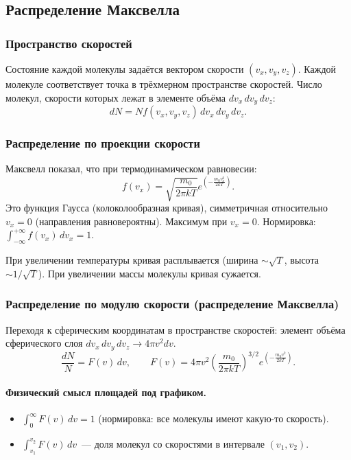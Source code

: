 \documentclass[12pt]{article}
\begin{document}
\subsection{Распределение Максвелла}

\subsubsection{Пространство скоростей}

Состояние каждой молекулы задаётся вектором скорости $(v_x, v_y, v_z)$. Каждой молекуле соответствует точка в трёхмерном пространстве скоростей. Число молекул, скорости которых лежат в элементе объёма $dv_x\,dv_y\,dv_z$:
\[
	dN = N f(v_x, v_y, v_z) \, dv_x \, dv_y \, dv_z.
\]

\subsubsection{Распределение по проекции скорости}

Максвелл показал, что при термодинамическом равновесии:
\[
	f(v_x) = \sqrt{\frac{m_0}{2\pi kT}} e^{\left(-\frac{m_0 v_x^2}{2kT}\right)}.
\]
Это функция Гаусса (колоколообразная кривая), симметричная относительно $v_x = 0$ (направления равновероятны). Максимум при $v_x = 0$. Нормировка: $\int_{-\infty}^{+\infty} f(v_x)\,dv_x = 1$.

При увеличении температуры кривая расплывается (ширина $\sim\sqrt{T}$, высота $\sim 1/\sqrt{T}$). При увеличении массы молекулы кривая сужается.

\subsubsection{Распределение по модулю скорости (распределение Максвелла)}

Переходя к сферическим координатам в пространстве скоростей: элемент объёма сферического слоя $dv_x\,dv_y\,dv_z \to 4\pi v^2 dv$.
\[
	\frac{dN}{N} = F(v) \, dv, \qquad F(v) = 4\pi v^2 \left(\frac{m_0}{2\pi kT}\right)^{3/2} e^{\left(-\frac{m_0 v^2}{2kT}\right)}.
\]

\paragraph{Физический смысл площадей под графиком.}
\begin{itemize}
	\item $\int_0^\infty F(v)\,dv = 1$ (нормировка: все молекулы имеют какую-то скорость).
	\item $\int_{v_1}^{v_2} F(v)\,dv$~--- доля молекул со скоростями в интервале $(v_1, v_2)$.
\end{itemize}
\end{document}
